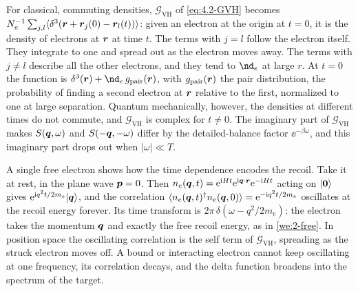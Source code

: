For classical, commuting densities, $\mathcal{G}_{\mathrm{VH}}$ of \cref{eq:4.2-GVH} becomes $N_e^{-1}\sum_{j,l}\langle\delta^3(\bm{r} + \bm{r}_j(0) - \bm{r}_l(t))\rangle$: given an electron at the origin at $t = 0$, it is the density of electrons at $\bm{r}$ at time $t$. The terms with $j = l$ follow the electron itself. They integrate to one and spread out as the electron moves away. The terms with $j \ne l$ describe all the other electrons, and they tend to $\nd_e$ at large $r$. At $t = 0$ the function is $\delta^3(\vect{r}) + \nd_e\,g_{\mathrm{pair}}(\vect{r})$, with $g_{\mathrm{pair}}(\bm{r})$ the pair distribution, the probability of finding a second electron at $\bm{r}$ relative to the first, normalized to one at large separation. Quantum mechanically, however, the densities at different times do not commute, and $\mathcal{G}_{\mathrm{VH}}$ is complex for $t \ne 0$. The imaginary part of $\mathcal{G}_{\mathrm{VH}}$ makes $S(\bm{q},\omega)$ and $S(-\bm{q},-\omega)$ differ by the detailed-balance factor $\ee^{-\beta\omega}$, and this imaginary part drops out when $|\omega| \ll T$.

A single free electron shows how the time dependence encodes the recoil. Take it at rest, in the plane wave $\bm{p} = 0$. Then $n_e(\bm{q},t) = \mathrm{e}^{\mathrm{i} Ht}\mathrm{e}^{\mathrm{i}\bm{q}\cdot\bm{r}}\mathrm{e}^{-\mathrm{i} Ht}$ acting on $|\bm{0}\rangle$ gives $\mathrm{e}^{\mathrm{i} q^2t/2m_e}|\bm{q}\rangle$, and the correlation $\langle n_e(\bm{q},t)^\dagger n_e(\bm{q},0)\rangle = \mathrm{e}^{-\mathrm{i} q^2t/2m_e}$ oscillates at the recoil energy forever. Its time transform is $2\pi\,\delta(\omega - q^2/2m_e)$: the electron takes the momentum $\bm{q}$ and exactly the free recoil energy, as in \cref{we:2-free}. In position space the oscillating correlation is the self term of $\mathcal{G}_{\mathrm{VH}}$, spreading as the struck electron moves off. A bound or interacting electron cannot keep oscillating at one frequency, its correlation decays, and the delta function broadens into the spectrum of the target.

